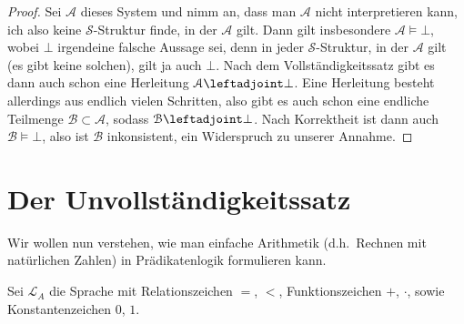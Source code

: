\documentclass[ngerman]{scrartcl}
\def\shows{\leftadjoint}
\begin{document}
\begin{proof}
  Sei $\mathcal{A}$ dieses System und nimm an, dass man $\mathcal{A}$ nicht interpretieren kann, ich also keine $\mathcal{S}$-Struktur finde, in der $\mathcal{A}$ gilt.
  Dann gilt insbesondere $\mathcal{A} \models \bot$, wobei $\bot$ irgendeine falsche Aussage sei, denn in jeder $\mathcal{S}$-Struktur, in der $\mathcal{A}$ gilt (es gibt keine solchen), gilt ja auch $\bot$.
  Nach dem Vollständigkeitssatz gibt es dann auch schon eine Herleitung $\mathcal{A} \shows \bot$.
  Eine Herleitung besteht allerdings aus endlich vielen Schritten,
  also gibt es auch schon eine endliche Teilmenge $\mathcal{B} \subset \mathcal{A}$,
  sodass $\mathcal{B} \shows \bot$.
  Nach Korrektheit ist dann auch $\mathcal{B} \models \bot$,
  also ist $\mathcal{B}$ inkonsistent, ein Widerspruch zu unserer Annahme.
\end{proof}

\section{Der Unvollständigkeitssatz}

Wir wollen nun verstehen, wie man einfache Arithmetik
(d.h.~Rechnen mit natürlichen Zahlen) in Prädikatenlogik formulieren kann.

\begin{definition}
  Sei $\mathcal{L}_A$ die Sprache mit Relationszeichen $=$, $<$, Funktionszeichen $+$, $\cdot $, sowie Konstantenzeichen $0$, $1$.
\end{definition}
\end{document}
